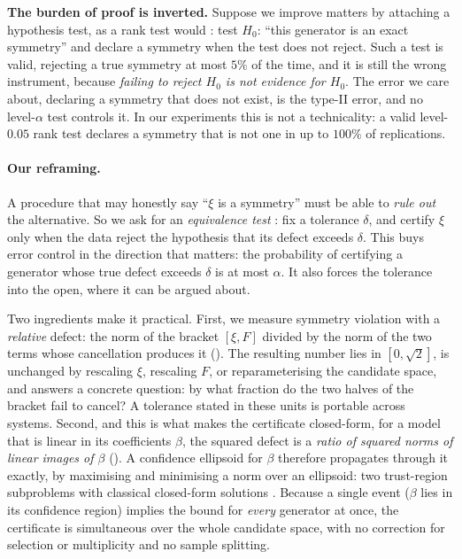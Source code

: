 \textbf{The burden of proof is inverted.} Suppose we improve matters by
attaching a hypothesis test, as a rank test would \citep{robin2000tests,
kleibergen2006generalized}: test $H_0$: ``this generator is an exact
symmetry'' and declare a symmetry when the test does not reject. Such a test
is valid, rejecting a true symmetry at most $5\%$ of the time, and it is still
the wrong instrument, because \emph{failing to reject $H_0$ is not evidence
for $H_0$}. The error we care about, declaring a symmetry that does not exist,
is the type-II error, and no level-$\alpha$ test controls it. In our
experiments this is not a technicality: a valid level-$0.05$ rank test
declares a symmetry that is not one in up to $100\%$ of replications.

\paragraph{Our reframing.} A procedure that may honestly say ``$\xi$ is a
symmetry'' must be able to \emph{rule out} the alternative. So we ask for an
\emph{equivalence test}
\citep{schuirmann1987comparison,berger1996bioequivalence, wellek2010testing}:
fix a tolerance $\delta$, and certify $\xi$ only when the data reject the
hypothesis that its defect exceeds $\delta$. This buys error control in the
direction that matters: the probability of certifying a generator whose true
defect exceeds $\delta$ is at most $\alpha$. It also forces the tolerance into
the open, where it can be argued about.

Two ingredients make it practical. First, we measure symmetry violation with a
\emph{relative} defect: the norm of the bracket $[\xi,F]$ divided by the norm
of the two terms whose cancellation produces it (). The
resulting number lies in $[0,\sqrt 2]$, is unchanged by rescaling $\xi$,
rescaling $F$, or reparameterising the candidate space, and answers a concrete
question: by what fraction do the two halves of the bracket fail to cancel? A
tolerance stated in these units is portable across systems. Second, and this
is what makes the certificate closed-form, for a model that is linear in its
coefficients $\beta$, the squared defect is a \emph{ratio of squared norms of
linear images of $\beta$} (). A confidence ellipsoid for
$\beta$ therefore propagates through it exactly, by maximising and minimising
a norm over an ellipsoid: two trust-region subproblems with classical
closed-form solutions \citep{gander1989constrained,more1983computing}. Because
a single event ($\beta$ lies in its confidence region) implies the bound for
\emph{every} generator at once, the certificate is simultaneous over the whole
candidate space, with no correction for selection or multiplicity and no
sample splitting.

